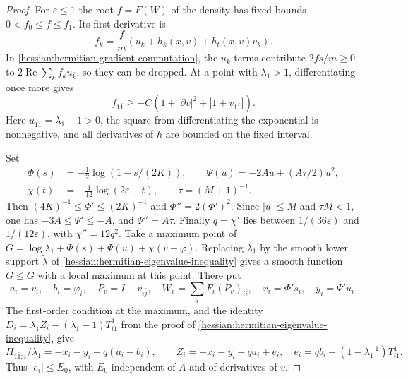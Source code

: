 \begin{proof}
For $\varepsilon\leq1$ the root $f=F(W)$ of the density has fixed bounds $0<f_0\leq f\leq f_1$. Its first derivative is
\[
 f_k=\frac f m(u_k+h_k(x,v)+h_t(x,v)v_k).
\]
In \cref{hessian:hermitian-gradient-commutation}, the $u_k$ terms contribute $2fs/m\geq0$ to $2\operatorname{Re}\sum_kf_ku_{\bar k}$, so they can be dropped. At a point with $\lambda_1>1$, differentiating once more gives
\[
 f_{1\bar1}\geq-C(1+|\partial v|^2+|1+v_{1\bar1}|).
\]
Here $u_{1\bar1}=\lambda_1-1>0$, the square from differentiating the exponential is nonnegative, and all derivatives of $h$ are bounded on the fixed interval.

Set
\begin{align*}
 \Phi(s)&=-\tfrac12\log(1-s/(2K)),\qquad
 \Psi(u)=-2Au+(A\tau/2)u^2,\\
 \chi(t)&=-\tfrac1{12}\log(2\varepsilon-t),\qquad \tau=(M+1)^{-1}.
\end{align*}
Then $(4K)^{-1}\leq\Phi'\leq(2K)^{-1}$ and $\Phi''=2(\Phi')^2$. Since $|u|\leq M$ and $\tau M<1$, one has $-3A\leq\Psi'\leq-A$, and $\Psi''=A\tau$. Finally $q=\chi'$ lies between $1/(36\varepsilon)$ and $1/(12\varepsilon)$, with $\chi''=12q^2$.
Take a maximum point of $G=\log\lambda_1+\Phi(s)+\Psi(u)+\chi(v-\varphi)$. Replacing $\lambda_1$ by the smooth lower support $\widetilde\lambda$ of \cref{hessian:hermitian-eigenvalue-inequality} gives a smooth function $\widetilde G\leq G$ with a local maximum at this point. There put
\[
 a_i=v_i,\quad b_i=\varphi_i,\quad P_v=I+v_{i\bar j},\quad
 W_v=\sum_iF_i(P_v)_{i\bar i},\quad
 x_i=\Phi's_i,\quad y_i=\Psi'u_i.
\]
The first-order condition at the maximum, and the identity $D_i=\lambda_1Z_i-(\lambda_1-1)T^1_{i1}$ from the proof of \cref{hessian:hermitian-eigenvalue-inequality}, give
\[
 H_{1\bar1;i}/\lambda_1=-x_i-y_i-q(a_i-b_i),\qquad
 Z_i=-x_i-y_i-qa_i+e_i,\quad
 e_i=qb_i+(1-\lambda_1^{-1})T^1_{i1}.
\]
Thus $|e_i|\leq E_0$, with $E_0$ independent of $A$ and of derivatives of $v$.


\end{proof}
